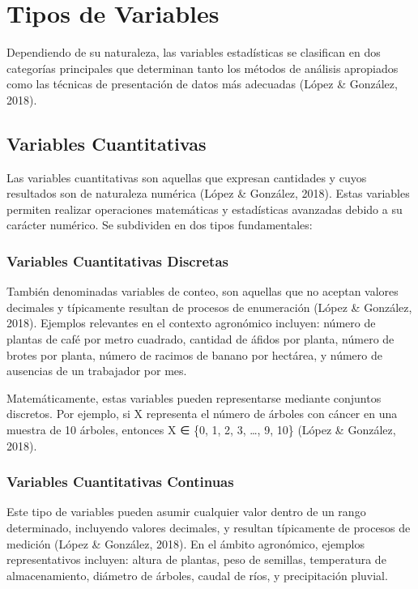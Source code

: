 \documentclass[
  spanish,
  letterpaper,
]{book}
\begin{document}
\section{Tipos de Variables}\label{tipos-de-variables}

Dependiendo de su naturaleza, las variables estadísticas se clasifican
en dos categorías principales que determinan tanto los métodos de
análisis apropiados como las técnicas de presentación de datos más
adecuadas (López \& González, 2018).

\subsection{Variables Cuantitativas}\label{variables-cuantitativas}

Las variables cuantitativas son aquellas que expresan cantidades y cuyos
resultados son de naturaleza numérica (López \& González, 2018). Estas
variables permiten realizar operaciones matemáticas y estadísticas
avanzadas debido a su carácter numérico. Se subdividen en dos tipos
fundamentales:

\subsubsection{Variables Cuantitativas
Discretas}\label{variables-cuantitativas-discretas}

También denominadas variables de conteo, son aquellas que no aceptan
valores decimales y típicamente resultan de procesos de enumeración
(López \& González, 2018). Ejemplos relevantes en el contexto agronómico
incluyen: número de plantas de café por metro cuadrado, cantidad de
áfidos por planta, número de brotes por planta, número de racimos de
banano por hectárea, y número de ausencias de un trabajador por mes.

Matemáticamente, estas variables pueden representarse mediante conjuntos
discretos. Por ejemplo, si X representa el número de árboles con cáncer
en una muestra de 10 árboles, entonces X ∈ \{0, 1, 2, 3, \ldots, 9, 10\}
(López \& González, 2018).

\subsubsection{Variables Cuantitativas
Continuas}\label{variables-cuantitativas-continuas}

Este tipo de variables pueden asumir cualquier valor dentro de un rango
determinado, incluyendo valores decimales, y resultan típicamente de
procesos de medición (López \& González, 2018). En el ámbito agronómico,
ejemplos representativos incluyen: altura de plantas, peso de semillas,
temperatura de almacenamiento, diámetro de árboles, caudal de ríos, y
precipitación pluvial.
\end{document}
